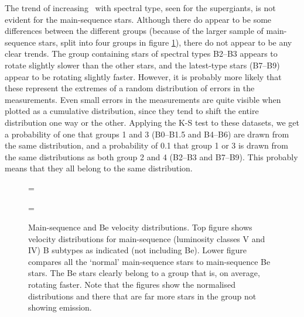 The trend of increasing \vsini\ with spectral type, seen for the
supergiants, is not evident for the main-sequence stars. Although there
do appear to be some differences between the different groups
(because of the larger sample of main-sequence stars, split
into four groups in figure \ref{fig:veldist_gr}), there do not
appear to be any clear trends. The group containing stars of spectral
types B2--B3 appears to rotate slightly slower than the other stars,
and the latest-type stars (B7--B9) appear to be rotating slightly
faster. However, it is probably more likely that these represent the
extremes of a random distribution of errors in the measurements. Even
small errors in the measurements are quite visible when plotted as a
cumulative distribution, since they tend to shift the entire
distribution one way or the other. Applying the K-S test to these
datasets, we get a probability of one that groups 1 and 3 (B0--B1.5
and B4--B6) are drawn from the same distribution, and a probability of
0.1 that group 1 or 3 is drawn from the same distributions as both
group 2 and 4 (B2--B3 and B7--B9). This probably means that they all
belong to the same distribution.


\begin{figure} %
\epsfxsize=\figwidth
\setlength{\cen}{(\textwidth / 2) - (\epsfxsize / 2)}
\hspace{\cen}

\epsfxsize=\figwidth
\setlength{\cen}{(\textwidth / 2) - (\epsfxsize / 2)}
\hspace{\cen}

\caption[Main-sequence and Be velocity distributions]
{\fcfont Main-sequence and Be velocity distributions. Top figure shows
velocity distributions for main-sequence (luminosity classes V and IV)
B subtypes as indicated (not including Be). Lower figure compares all
the `normal' main-sequence stars to main-sequence Be stars. The Be
stars clearly belong to a group that is, on average, rotating
faster. Note that the figures show the normalised distributions and
there that are far more stars in the group not showing emission.
}
\label{fig:veldist_gr}
\end{figure}   %


\newpage

